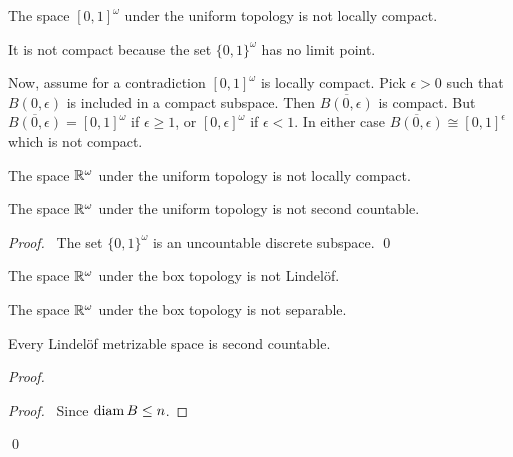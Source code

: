 \begin{example}
    The space $[0,1]^\omega$ under the uniform topology is not locally compact.

    It is not compact because the set $\{ 0,1 \}^\omega$ has no limit point.

    Now, assume for a contradiction $[0,1]^\omega$ is locally compact. Pick $\epsilon > 0$
    such that $B(0,\epsilon)$ is included in a compact subspace. Then $\overline{B(0,\epsilon)}$ is compact.
    But $\overline{B(0,\epsilon)} = [0,1]^\omega$ if $\epsilon \geq 1$, or $[0,\epsilon]^\omega$
    if $\epsilon < 1$. In either case $\overline{B(0,\epsilon)} \cong [0,1]^\epsilon$ which is not
    compact.
\end{example}

\begin{corollary}
    The space $\mathbb{R}^\omega$ under the uniform topology is not locally compact.
\end{corollary}

\begin{example}
    The space $\mathbb{R}^\omega$ under the uniform topology is not second countable.

    \begin{proof}
        \pf\ The set $\{0,1\}^\omega$ is an uncountable discrete subspace. \qed
    \end{proof}
\end{example}

\begin{corollary}
    The space $\mathbb{R}^\omega$ under the box topology is not Lindel\"{o}f.
\end{corollary}

\begin{corollary}
    The space $\mathbb{R}^\omega$ under the box topology is not separable.
\end{corollary}

\begin{proposition}[Choice]
    \label{proposition:Lindelof_metrizable_second_countable}
    Every Lindel\"{o}f metrizable space is second countable.
\end{proposition}

\begin{proof}
    \pf
    \begin{proof}
        \pf\ Since $\operatorname{diam} B \leq n$.
    \end{proof}
    \qed
\end{proof}

